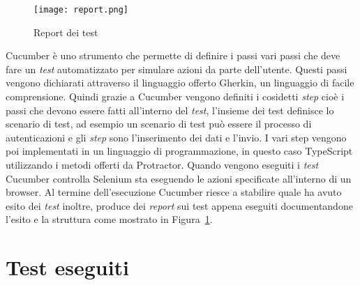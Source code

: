\begin{figure}[h] 
	\begin{center}
		\texttt{[image: report.png]}
		\caption{Report dei test}\label{fig:testDoc}
	\end{center}
\end{figure}
Cucumber è uno strumento che permette di definire i passi vari passi che deve fare un \emph{test} automatizzato per simulare azioni da parte dell'utente. Questi passi vengono dichiarati attraverso il linguaggio offerto Gherkin, un linguaggio di facile comprensione. Quindi grazie a Cucumber vengono definiti i cosidetti \emph{step} cioè i passi che devono essere fatti all'interno del \emph{test}, l'insieme dei test definisce lo scenario di test, ad esempio un scenario di test può essere il processo di autenticazioni e gli \emph{step} sono l'inserimento dei dati e l'invio. I vari step vengono poi implementati in un linguaggio di programmazione, in questo caso TypeScript utilizzando i metodi offerti da Protractor. Quando vengono eseguiti i \emph{test} Cucumber controlla Selenium sta eseguendo le azioni specificate all’interno di un browser. Al termine dell'esecuzione Cucumber riesce a stabilire quale ha avuto esito dei \emph{test} inoltre, produce dei \emph{report} sui test appena eseguiti documentandone l'esito e la struttura come mostrato in Figura~\ref{fig:testDoc}.

\section{Test eseguiti}
